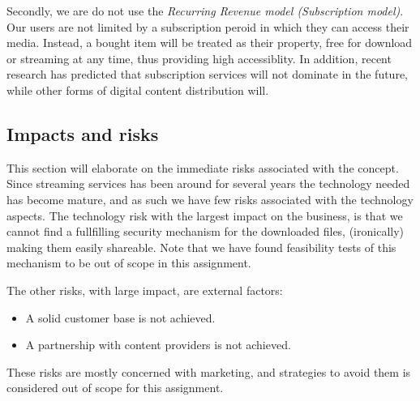 Secondly, we are do not use the \emph{Recurring Revenue model (Subscription model)}\cite{businessmodel}. Our users are not limited by a subscription peroid in which they can access their media. Instead, a bought item will be treated as their property, free for download or streaming at any time, thus providing high accessiblity. In addition, recent research\cite{ott} has predicted that subscription services will not dominate in the future, while other forms of digital content distribution will.

\subsection{Impacts and risks}
This section will elaborate on the immediate risks associated with the concept. Since streaming services has been around for several years the technology needed has become mature, and as such we have few risks associated with the technology aspects. The technology risk with the largest impact on the business, is that we cannot find a fullfilling security mechanism for the downloaded files, (ironically) making them easily shareable. Note that we have found feasibility tests of this mechanism to be out of scope in this assignment.

The other risks, with large impact, are external factors:
\begin{itemize}
\item A solid customer base is not achieved.
\item A partnership with content providers is not achieved.
\end{itemize}

These risks are mostly concerned with marketing, and strategies to avoid them is considered out of scope for this assignment.
